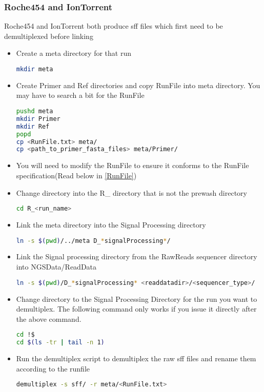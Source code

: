 \documentclass{article}
\begin{document}
\subsubsection{Roche454 and IonTorrent}
Roche454 and IonTorrent both produce sff files which first need to be demultiplexed before linking
\begin{itemize}
\item Create a meta directory for that run
{\tiny
\begin{lstlisting}[language=bash]
mkdir meta
\end{lstlisting}
}
 
\item Create Primer and Ref directories and copy RunFile into meta directory. You may have to search a bit for the RunFile
{\tiny
\begin{lstlisting}[language=bash]
pushd meta
mkdir Primer
mkdir Ref
popd
cp <RunFile.txt> meta/
cp <path_to_primer_fasta_files> meta/Primer/
\end{lstlisting}
}

\item You will need to modify the RunFile to ensure it conforms to the RunFile specification(Read below in \ref{RunFile})

\item Change directory into the R\_ directory that is not the prewash directory
{\tiny
\begin{lstlisting}[language=bash]
cd R_<run_name>
\end{lstlisting}
}

\item Link the meta directory into the Signal Processing directory
{\tiny
\begin{lstlisting}[language=bash]
ln -s $(pwd)/../meta D_*signalProcessing*/
\end{lstlisting}
}

\item Link the Signal processing directory from the RawReads sequencer directory into NGSData/ReadData
{\tiny
\begin{lstlisting}[language=bash]
ln -s $(pwd)/D_*signalProcessing* <readdatadir>/<sequencer_type>/
\end{lstlisting}
}

\item Change directory to the Signal Processing Directory for the run you want to demultiplex. The following command only works if you issue it directly after the above command.
{\tiny
\begin{lstlisting}[language=bash]
cd !$
cd $(ls -tr | tail -n 1)
\end{lstlisting}
}

\item Run the demultiplex script to demultiplex the raw sff files and rename them according to the runfile
{\tiny
\begin{lstlisting}[language=bash]
demultiplex -s sff/ -r meta/<RunFile.txt>
\end{lstlisting}
}
\end{itemize}
\end{document}
